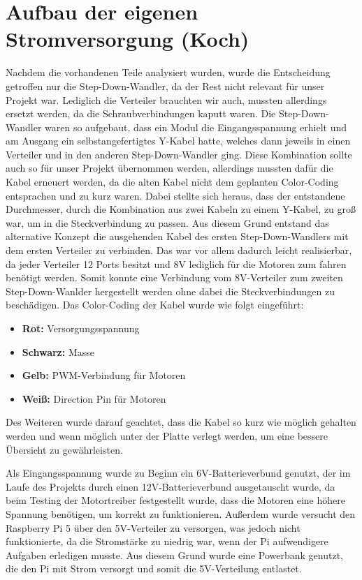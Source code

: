 \section{Aufbau der eigenen Stromversorgung (Koch)}
Nachdem die vorhandenen Teile analysiert wurden, wurde die Entscheidung getroffen nur die Step-Down-Wandler, da der Rest nicht relevant für unser Projekt war. Lediglich die Verteiler brauchten wir auch, mussten allerdings ersetzt werden, da die Schraubverbindungen kaputt waren.
Die Step-Down-Wandler waren so aufgebaut, dass ein Modul die Eingangsspannung erhielt und am Ausgang ein selbstangefertigtes Y-Kabel hatte, welches dann jeweils in einen Verteiler und in den anderen Step-Down-Wandler ging.
Diese Kombination sollte auch so für unser Projekt übernommen werden, allerdings mussten dafür die Kabel erneuert werden, da die alten Kabel nicht dem geplanten Color-Coding entsprachen und zu kurz waren. Dabei stellte sich heraus, dass der entstandene Durchmesser, durch die Kombination aus zwei Kabeln zu einem Y-Kabel, zu groß war, um in die Steckverbindung zu passen.
Aus diesem Grund entstand das alternative Konzept die ausgehenden Kabel des ersten Step-Down-Wandlers mit dem ersten Verteiler zu verbinden. Das war vor allem dadurch leicht realisierbar, da jeder Verteiler 12 Ports besitzt und 8V lediglich für die Motoren zum fahren benötigt werden. Somit konnte eine Verbindung vom 8V-Verteiler zum zweiten Step-Down-Wanlder hergestellt werden ohne dabei die Steckverbindungen zu beschädigen.
\newpage
Das Color-Coding der Kabel wurde wie folgt eingeführt:
\begin{itemize}
    \item \textbf{Rot:} Versorgungsspannung
    \item \textbf{Schwarz:} Masse
    \item \textbf{Gelb:} PWM-Verbindung für Motoren
    \item \textbf{Weiß:} Direction Pin für Motoren
\end{itemize}
Des Weiteren wurde darauf geachtet, dass die Kabel so kurz wie möglich gehalten werden und wenn möglich unter der Platte verlegt werden, um eine bessere Übersicht zu gewährleisten.

Als Eingangsspannung wurde zu Beginn ein 6V-Batterieverbund genutzt, der im Laufe des Projekts durch einen 12V-Batterieverbund ausgetauscht wurde, da beim Testing der Motortreiber festgestellt wurde, dass die Motoren eine höhere Spannung benötigen, um korrekt zu funktionieren. Außerdem wurde versucht den Raspberry Pi 5 über den 5V-Verteiler zu versorgen, was jedoch nicht funktionierte, da die Stromstärke zu niedrig war, wenn der Pi aufwendigere Aufgaben erledigen musste. Aus diesem Grund wurde eine Powerbank genutzt, die den Pi mit Strom versorgt und somit die 5V-Verteilung entlastet.

